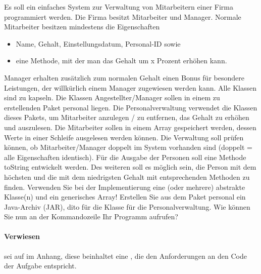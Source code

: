 Es soll ein einfaches System zur Verwaltung von Mitarbeitern einer Firma programmiert werden.
Die Firma besitzt  Mitarbeiter und Manager.
Normale Mitarbeiter besitzen mindestens die Eigenschaften
\begin{itemize}
    \item Name, Gehalt, Einstellungsdatum, Personal-ID sowie
    \item eine Methode, mit der man das Gehalt um x Prozent erhöhen kann.
\end{itemize}
Manager erhalten zusätzlich zum normalen Gehalt einen Bonus für besondere Leistungen, der willkürlich einem Manager zugewiesen werden kann.
Alle Klassen sind zu kapseln.
Die Klassen Angestellter/Manager sollen in einem zu erstellenden Paket personal liegen.
Die Personalverwaltung verwendet die Klassen dieses Pakets, um Mitarbeiter anzulegen / zu entfernen, das Gehalt zu erhöhen und auszulesen.
Die Mitarbeiter sollen in einem Array gespeichert werden, dessen Werte in einer Schleife ausgelesen werden können.
Die Verwaltung soll prüfen können, ob Mitarbeiter/Manager doppelt im System vorhanden sind (doppelt = alle Eigenschaften identisch).
Für die Ausgabe der Personen soll eine Methode toString entwickelt werden.
Des weiteren soll es möglich sein, die Person mit dem höchsten und die mit dem niedrigsten Gehalt mit entsprechenden Methoden zu finden.
Verwenden Sie bei der Implementierung eine (oder mehrere) abstrakte Klasse(n) und ein generisches Array!
Erstellen Sie aus dem Paket personal ein Java-Archiv (JAR), dito für die Klasse für die Personalverwaltung.
Wie können Sie nun an der Kommandozeile Ihr Programm aufrufen?

\paragraph{Verwiesen} sei auf  im Anhang, diese beinhaltet eine , die den Anforderungen an den Code der Aufgabe entspricht.

